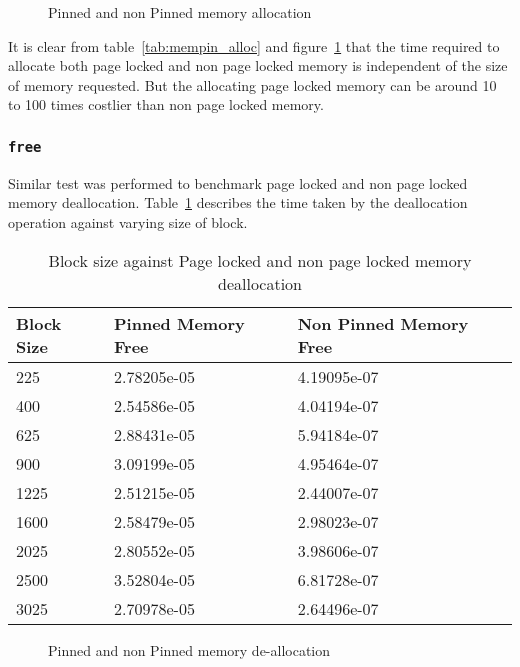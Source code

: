 \begin{figure}[h]
  
  \caption{Pinned and non Pinned memory allocation}
  \label{fig:mempin_alloc}
\end{figure}

It is clear from table~\ref{tab:mempin_alloc} and figure~\ref{fig:mempin_alloc}
that the time required to allocate both page locked and non page locked memory
is independent of the size of memory requested. But the allocating page locked
memory can be around 10 to 100 times costlier than non page locked memory.

\subsubsection{\texttt{free}}
Similar test was performed to benchmark page locked and non page locked memory
deallocation. Table~\ref{tab:mempin_free} describes the time taken by the deallocation
operation against varying size of block.

\begin{table}[h]
  \centering
  \begin{tabular}{l | l | l}
    \hline
    Block Size & Pinned Memory Free & Non Pinned Memory Free \\
    \hline
    225        & 2.78205e-05        & 4.19095e-07            \\
    400        & 2.54586e-05        & 4.04194e-07            \\
    625        & 2.88431e-05        & 5.94184e-07            \\
    900        & 3.09199e-05        & 4.95464e-07            \\
    1225       & 2.51215e-05        & 2.44007e-07            \\
    1600       & 2.58479e-05        & 2.98023e-07            \\
    2025       & 2.80552e-05        & 3.98606e-07            \\
    2500       & 3.52804e-05        & 6.81728e-07            \\
    3025       & 2.70978e-05        & 2.64496e-07            \\
    \hline
  \end{tabular}
  \caption{Block size against Page locked and non page locked memory deallocation}
  \label{tab:mempin_free}
\end{table}

\begin{figure}[h]
  
  \caption{Pinned and non Pinned memory de-allocation}
  \label{fig:mempin_free}
\end{figure}

